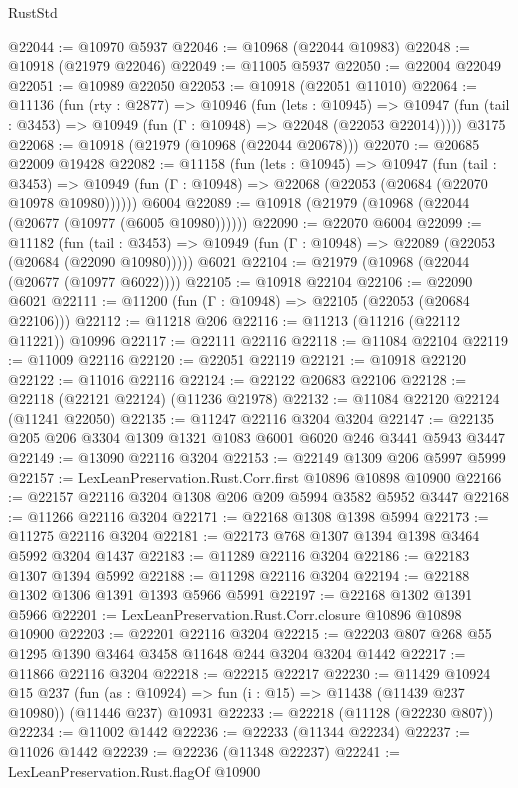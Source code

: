 \begin{lexlean}{RustStd}
\begin{coremodule}
{{{{{{{{{{{{{{{{{{{@22044 := @10970 @5937
@22046 := @10968 (@22044 @10983)
@22048 := @10918 (@21979 @22046)
@22049 := @11005 @5937
@22050 := @22004 @22049
@22051 := @10989 @22050
@22053 := @10918 (@22051 @11010)
@22064 := @11136
    (fun (rty : @2877) =>
    @10946
      (fun (lets : @10945) =>
      @10947 (fun (tail : @3453) => @10949 (fun (Γ : @10948) => @22048 (@22053 @22014)))))
    @3175
@22068 := @10918 (@21979 (@10968 (@22044 @20678)))
@22070 := @20685 @22009 @19428
@22082 := @11158
    (fun (lets : @10945) =>
    @10947
      (fun (tail : @3453) =>
      @10949 (fun (Γ : @10948) => @22068 (@22053 (@20684 (@22070 @10978 @10980))))))
    @6004
@22089 := @10918 (@21979 (@10968 (@22044 (@20677 (@10977 (@6005 @10980))))))
@22090 := @22070 @6004
@22099 := @11182
    (fun (tail : @3453) => @10949 (fun (Γ : @10948) => @22089 (@22053 (@20684 (@22090 @10980)))))
    @6021
@22104 := @21979 (@10968 (@22044 (@20677 (@10977 @6022))))
@22105 := @10918 @22104
@22106 := @22090 @6021
@22111 := @11200 (fun (Γ : @10948) => @22105 (@22053 (@20684 @22106)))
@22112 := @11218 @206
@22116 := @11213 (@11216 (@22112 @11221)) @10996
@22117 := @22111 @22116
@22118 := @11084 @22104
@22119 := @11009 @22116
@22120 := @22051 @22119
@22121 := @10918 @22120
@22122 := @11016 @22116
@22124 := @22122 @20683 @22106
@22128 := @22118 (@22121 @22124) (@11236 @21978)
@22132 := @11084 @22120 @22124 (@11241 @22050)
@22135 := @11247 @22116 @3204 @3204
@22147 := @22135 @205 @206 @3304 @1309 @1321 @1083 @6001 @6020 @246 @3441 @5943 @3447
@22149 := @13090 @22116 @3204
@22153 := @22149 @1309 @206 @5997 @5999
@22157 := LexLeanPreservation.Rust.Corr.first @10896 @10898 @10900
@22166 := @22157 @22116 @3204 @1308 @206 @209 @5994 @3582 @5952 @3447
@22168 := @11266 @22116 @3204
@22171 := @22168 @1308 @1398 @5994
@22173 := @11275 @22116 @3204
@22181 := @22173 @768 @1307 @1394 @1398 @3464 @5992 @3204 @1437
@22183 := @11289 @22116 @3204
@22186 := @22183 @1307 @1394 @5992
@22188 := @11298 @22116 @3204
@22194 := @22188 @1302 @1306 @1391 @1393 @5966 @5991
@22197 := @22168 @1302 @1391 @5966
@22201 := LexLeanPreservation.Rust.Corr.closure @10896 @10898 @10900
@22203 := @22201 @22116 @3204
@22215 := @22203 @807 @268 @55 @1295 @1390 @3464 @3458 @11648 @244 @3204 @3204 @1442
@22217 := @11866 @22116 @3204
@22218 := @22215 @22217
@22230 := @11429
    @10924
    @15
    @237
    (fun (as : @10924) => fun (i : @15) => @11438 (@11439 @237 @10980))
    (@11446 @237)
    @10931
@22233 := @22218 (@11128 (@22230 @807))
@22234 := @11002 @1442
@22236 := @22233 (@11344 @22234)
@22237 := @11026 @1442
@22239 := @22236 (@11348 @22237)
@22241 := LexLeanPreservation.Rust.flagOf @10900
}}}}}}}}}}}}}}}}}}}
\end{coremodule}
\end{lexlean}
